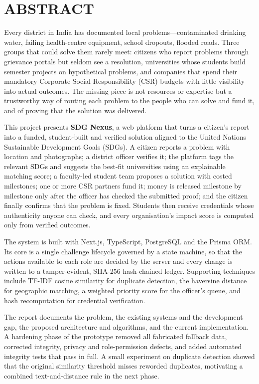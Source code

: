 \chapter*{ABSTRACT}
Every district in India has documented local problems---contaminated drinking water, failing health-centre equipment, school dropouts, flooded roads. Three groups that could solve them rarely meet: citizens who report problems through grievance portals but seldom see a resolution, universities whose students build semester projects on hypothetical problems, and companies that spend their mandatory Corporate Social Responsibility (CSR) budgets with little visibility into actual outcomes. The missing piece is not resources or expertise but a trustworthy way of routing each problem to the people who can solve and fund it, and of proving that the solution was delivered.

This project presents \textbf{SDG Nexus}, a web platform that turns a citizen's report into a funded, student-built and verified solution aligned to the United Nations Sustainable Development Goals (SDGs). A citizen reports a problem with location and photographs; a district officer verifies it; the platform tags the relevant SDGs and suggests the best-fit universities using an explainable matching score; a faculty-led student team proposes a solution with costed milestones; one or more CSR partners fund it; money is released milestone by milestone only after the officer has checked the submitted proof; and the citizen finally confirms that the problem is fixed. Students then receive credentials whose authenticity anyone can check, and every organisation's impact score is computed only from verified outcomes.

The system is built with Next.js, TypeScript, PostgreSQL and the Prisma ORM. Its core is a single challenge lifecycle governed by a state machine, so that the actions available to each role are decided by the server and every change is written to a tamper-evident, SHA-256 hash-chained ledger. Supporting techniques include TF-IDF cosine similarity for duplicate detection, the haversine distance for geographic matching, a weighted priority score for the officer's queue, and hash recomputation for credential verification.

The report documents the problem, the existing systems and the development gap, the proposed architecture and algorithms, and the current implementation. A hardening phase of the prototype removed all fabricated fallback data, corrected integrity, privacy and role-permission defects, and added automated integrity tests that pass in full. A small experiment on duplicate detection showed that the original similarity threshold misses reworded duplicates, motivating a combined text-and-distance rule in the next phase.

